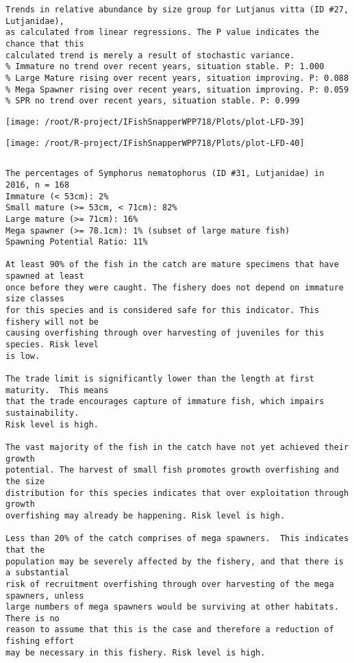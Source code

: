 \documentclass{report}\usepackage[]{graphicx}\usepackage[]{color}
\makeatletter
\def\maxwidth{ %
  \ifdim\Gin@nat@width>\linewidth
    \linewidth
  \else
    \Gin@nat@width
  \fi
}
\newenvironment{kframe}{%
 \def\at@end@of@kframe{}%
 \ifinner\ifhmode%
  \def\at@end@of@kframe{\end{minipage}}%
  \begin{minipage}{\columnwidth}%
 \fi\fi%
 \def\FrameCommand##1{\hskip\@totalleftmargin \hskip-\fboxsep
 \colorbox{shadecolor}{##1}\hskip-\fboxsep
     \hskip-\linewidth \hskip-\@totalleftmargin \hskip\columnwidth}%
 \MakeFramed {\advance\hsize-\width
   \@totalleftmargin\z@ \linewidth\hsize
   \@setminipage}}%
 {\par\unskip\endMakeFramed%
 \at@end@of@kframe}
\newenvironment{knitrout}{}{} %
\makeatother
\begin{document}
\begin{knitrout}
\begin{kframe}
\begin{verbatim}
Trends in relative abundance by size group for Lutjanus vitta (ID #27, Lutjanidae),
as calculated from linear regressions. The P value indicates the chance that this
calculated trend is merely a result of stochastic variance.
% Immature no trend over recent years, situation stable. P: 1.000
% Large Mature rising over recent years, situation improving. P: 0.088
% Mega Spawner rising over recent years, situation improving. P: 0.059
% SPR no trend over recent years, situation stable. P: 0.999
\end{verbatim}
\end{kframe}
\texttt{[image: /root/R-project/IFishSnapperWPP718/Plots/plot-LFD-39]} 

\texttt{[image: /root/R-project/IFishSnapperWPP718/Plots/plot-LFD-40]} 
\begin{kframe}\begin{verbatim}
\end{verbatim}
\end{kframe}
\clearpage
\newpage
\begin{kframe}\begin{verbatim}The percentages of Symphorus nematophorus (ID #31, Lutjanidae) in 2016, n = 168
Immature (< 53cm): 2%
Small mature (>= 53cm, < 71cm): 82%
Large mature (>= 71cm): 16%
Mega spawner (>= 78.1cm): 1% (subset of large mature fish)
Spawning Potential Ratio: 11%
 
At least 90% of the fish in the catch are mature specimens that have spawned at least
once before they were caught. The fishery does not depend on immature size classes
for this species and is considered safe for this indicator. This fishery will not be
causing overfishing through over harvesting of juveniles for this species. Risk level
is low.

The trade limit is significantly lower than the length at first maturity.  This means
that the trade encourages capture of immature fish, which impairs sustainability.
Risk level is high.

The vast majority of the fish in the catch have not yet achieved their growth
potential. The harvest of small fish promotes growth overfishing and the size
distribution for this species indicates that over exploitation through growth
overfishing may already be happening. Risk level is high.

Less than 20% of the catch comprises of mega spawners.  This indicates that the
population may be severely affected by the fishery, and that there is a substantial
risk of recruitment overfishing through over harvesting of the mega spawners, unless
large numbers of mega spawners would be surviving at other habitats. There is no
reason to assume that this is the case and therefore a reduction of fishing effort
may be necessary in this fishery. Risk level is high.
 

\end{verbatim}
\end{kframe}
\end{knitrout}
\end{document}
